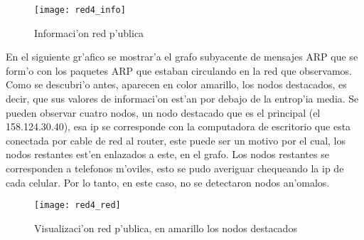\begin{figure}[!h]
\centering
\caption{Informaci'on red p'ublica}
\texttt{[image: red4\_info]}
 \label{fig:red3info}
\end{figure}

En el siguiente gr'afico se mostrar'a el grafo subyacente de mensajes ARP que se form'o con los paquetes ARP que estaban circulando 
en la red que observamos. Como se descubri'o antes, aparecen en color amarillo, los nodos destacados, es decir, que sus valores de
 informaci'on est'an por debajo de la entrop'ia media. Se pueden observar cuatro nodos, un nodo destacado que es el principal (el 158.124.30.40),
 esa ip se corresponde con la computadora de escritorio que esta conectada por cable de red al router, este puede ser un motivo por el cual,
 los nodos restantes est'en enlazados a este, en el grafo. Los nodos restantes se corresponden a telefonos m'oviles, esto se pudo averiguar 
 chequeando la ip de cada celular. Por lo tanto, en este caso, no se detectaron nodos an'omalos. \\
 

\begin{figure}[!h]
\caption{Visualizaci'on red p'ublica, en amarillo los nodos destacados}
\texttt{[image: red4\_red]}
 \label{fig:red3net}
\end{figure}

